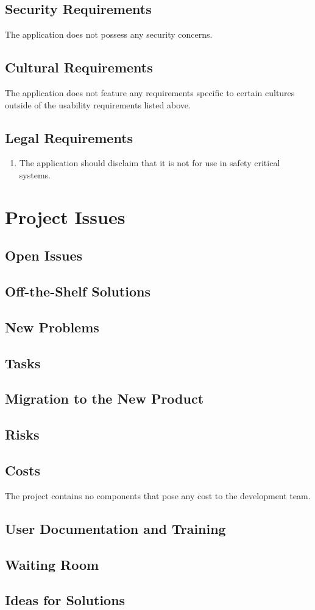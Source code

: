 \documentclass{article}
\begin{document}
\subsection{Security Requirements}
The application does not possess any security concerns.
\subsection{Cultural Requirements}
The application does not feature any requirements specific to certain cultures outside of the usability requirements listed above.
\subsection{Legal Requirements}
\begin{enumerate}
\item The application should disclaim that it is not for use in safety critical systems.
\end{enumerate}

\section{Project Issues}

\subsection{Open Issues }
\subsection{Off-the-Shelf Solutions}
\subsection{New Problems}
\subsection{Tasks}
\subsection{Migration to the New Product}
\subsection{Risks}
\subsection{Costs}
The project contains no components that pose any cost to the development team.
\subsection{User Documentation and Training}
\subsection{Waiting Room}
\subsection{Ideas for Solutions}
\end{document}
